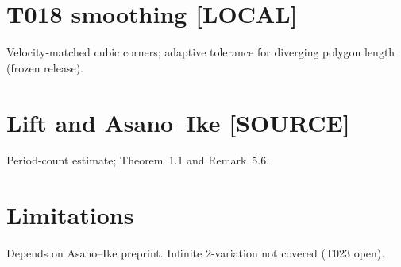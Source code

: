 \documentclass[11pt]{article}
\theoremstyle{definition}
\theoremstyle{remark}
\newcommand{\tagsource}{\textsf{\footnotesize[SOURCE]}}
\newcommand{\taglocal}{\textsf{\footnotesize[LOCAL]}}
\begin{document}
\section{T018 smoothing \taglocal}
Velocity-matched cubic corners; adaptive tolerance for diverging polygon length (frozen release).

\section{Lift and Asano--Ike \tagsource}
Period-count estimate; Theorem~1.1 and Remark~5.6.

\section{Limitations}
Depends on Asano--Ike preprint. Infinite $2$-variation not covered (T023 open).
\end{document}

